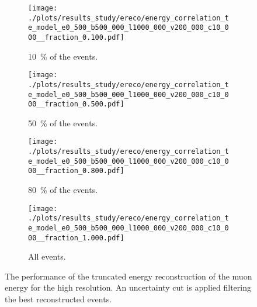 \begin{figure}[H]
    \centering
    \begin{subfigure}{0.48\textwidth}
        \centering
        \texttt{[image: ./plots/results\_study/ereco/energy\_correlation\_te\_model\_e0\_500\_b500\_000\_l1000\_000\_v200\_000\_c10\_000\_\_fraction\_0.100.pdf]}
        \caption{\SI{10}{\%} of the events.}
        \label{fig:study_ereco_te_high_perform_0.1}
    \end{subfigure}
    \hfill
    \begin{subfigure}{0.48\textwidth}
        \centering
        \texttt{[image: ./plots/results\_study/ereco/energy\_correlation\_te\_model\_e0\_500\_b500\_000\_l1000\_000\_v200\_000\_c10\_000\_\_fraction\_0.500.pdf]}
        \caption{\SI{50}{\%} of the events.}
        \label{fig:study_ereco_te_high_perform_0.5}
    \end{subfigure}
    \begin{subfigure}{0.48\textwidth}
        \vspace{0.5cm}
        \centering
        \texttt{[image: ./plots/results\_study/ereco/energy\_correlation\_te\_model\_e0\_500\_b500\_000\_l1000\_000\_v200\_000\_c10\_000\_\_fraction\_0.800.pdf]}
        \caption{\SI{80}{\%} of the events.}
        \label{fig:study_ereco_te_high_perform_0.8}
    \end{subfigure}
    \hfill
    \begin{subfigure}{0.48\textwidth}
        \vspace{0.5cm}
        \centering
        \texttt{[image: ./plots/results\_study/ereco/energy\_correlation\_te\_model\_e0\_500\_b500\_000\_l1000\_000\_v200\_000\_c10\_000\_\_fraction\_1.000.pdf]}
        \caption{All events.}
        \label{fig:study_ereco_te_high_perform_1.0}
    \end{subfigure}
    \caption{The performance of the truncated energy reconstruction of the muon energy for the high resolution. An uncertainty cut is applied filtering the best reconstructed events.}
    \label{fig:study_ereco_te_high_perform}
\end{figure}

